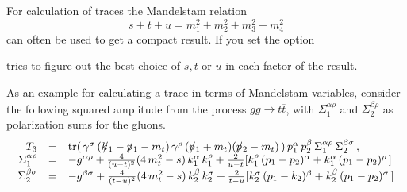 For calculation of traces the Mandelstam relation
\[
s+t+u=m_1^{2} + m_2^{2} + m_3^{2} + m_4^{2}
\]
can often be used to get a compact result.  If you set the option


\fc tries to figure out the best choice of $s, t$ or $u$ in each factor of the result.

As an example for calculating a trace in terms of Mandelstam variables, consider  the following squared amplitude from the process $gg\rightarrow t\overline{t}$, with $\Sigma_1^{\alpha \rho}$ and $\Sigma_2^{\beta \rho}$ as polarization sums for the gluons.
\[
\begin{array}{rcl}
T_3 &=& {\rm tr}(\,\gamma^{\sigma}\,(k \hspace{-1.5mm} /_1 - p \hspace{-1.5mm} /_1 - m_t)\, \gamma^{\rho}\,(p \hspace{-1.5mm} /_1+m_t)
(p \hspace{-1.5mm} /_2 - m_t)\,) \, p_1^{\alpha} \, p_2^{\beta} \, \Sigma_1^{\alpha \rho} \,
\Sigma_2^{\beta \sigma}\,,
\nonumber \\
\Sigma_1^{\alpha \rho}&=& -g^{\alpha \rho} + \frac{4}{(u-t)^{2}} (4\,m_t^{2} - s)\,k_1^{\alpha}\,
k_1^{\rho} + \frac{2}{u-t} [k_1^{\rho}\,(p_1 - p_2)^{\alpha} + 
                 k_1^{\alpha}\,(p_1 - p_2)^{\rho}\,] \nonumber \\
\Sigma_2^{\beta \sigma} &=& -g^{\beta \sigma} + \frac{4}{(t-u)^{2}} (4\,m_t^{2} - s)\,k_2^{\beta}\,
k_2^{\sigma} + \frac{2}{t-u} [k_2^{\sigma}\,(p_1 - k_2)^{\beta} + 
                 k_2^{\beta}\,(p_1 - p_2)^{\sigma}\,] \nonumber 
\end{array}
\]
\beom
{}
